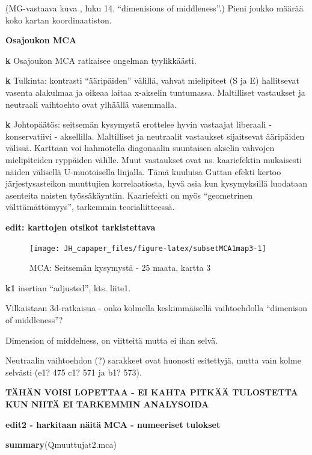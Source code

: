 \documentclass[
  finnish,
]{book}
\newenvironment{Shaded}{\begin{snugshade}}{\end{snugshade}}
\newcommand{\KeywordTok}[1]{\textcolor[rgb]{0.13,0.29,0.53}{\textbf{#1}}}
\newcommand{\NormalTok}[1]{#1}
\begin{document}
(MG-vastaava kuva \citep{RefWorks:doc:5a857a43e4b0ed2d44664d7c}, luku 14. ``dimenisions of middleness''.)
Pieni joukko määrää koko kartan koordinaatiston.

\textbf{Osajoukon MCA}

\textbf{k} Osajoukon MCA ratkaisee ongelman tyylikkäästi.

\textbf{k} Tulkinta: kontrasti ``ääripäiden'' välillä, vahvat mielipiteet (S ja E) hallitsevat vasenta alakulmaa ja oikeaa laitaa x-akselin tuntumassa. Maltilliset
vastaukset ja neutraali vaihtoehto ovat ylhäällä vasemmalla.

\textbf{k} Johtopäätös: seitsemän kysymystä erottelee hyvin vastaajat
liberaali - konservatiivi - aksellilla. Maltilliset ja neutraalit vastaukset sijaitsevat ääripäiden välissä. Karttaan voi hahmotella diagonaalin suuntaisen
akselin vahvojen mielipiteiden ryppäiden välille. Muut vastaukset ovat
ns. kaariefektin mukaisesti näiden välisellä U-muotoisella linjalla. Tämä kuuluisa Guttan efekti kertoo järjestysasteikon muuttujien korrelaatiosta, hyvä asia kun
kysymyksillä luodataan asenteita naisten työssäkäyntiin. Kaariefekti on myös ``geometrinen välttämättömyys'', tarkemmin teorialiitteessä.

\textbf{edit: karttojen otsikot tarkistettava}

\begin{figure}

{\centering \texttt{[image: JH\_capaper\_files/figure-latex/subsetMCA1map3-1]} 

}

\caption{MCA: Seitsemän kysymystä - 25 maata, kartta 3}\label{fig:subsetMCA1map3}
\end{figure}

\textbf{k1} inertian ``adjusted'', kts. liite1.

Vilkaistaan 3d-ratkaisua - onko kolmella keskimmäisellä vaihtoehdolla ``dimenison
of middleness''?

Dimension of middelness, on viitteitä mutta ei ihan selvä.

Neutraalin vaihtoehdon (?) sarakkeet ovat huonosti esitettyjä, mutta vain kolme selvästi
(e1? 475 c1? 571 ja b1? 573).

\textbf{TÄHÄN VOISI LOPETTAA - EI KAHTA PITKÄÄ TULOSTETTA KUN NIITÄ EI TARKEMMIN ANALYSOIDA}

\textbf{edit2 - harkitaan näitä}
\textbf{MCA - numeeriset tulokset}

\begin{Shaded}
\begin{Highlighting}[]
\KeywordTok{summary}\NormalTok{(Qmuuttujat2.mca)}
\end{Highlighting}
\end{Shaded}
\end{document}
